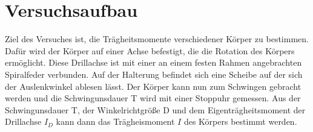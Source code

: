 \section{Versuchsaufbau}
\label{sec:Versuchsaufbau}

Ziel des Versuches ist, die Trägheitsmomente verschiedener Körper zu bestimmen. 
Dafür wird der Körper auf einer Achse befestigt, die die Rotation des Körpers ermöglicht.
Diese Drillachse ist mit einer an einem festen Rahmen angebrachten Spiralfeder verbunden.
Auf der Halterung befindet sich eine Scheibe auf der sich der Auslenkwinkel ablesen lässt.
Der Körper kann nun zum Schwingen gebracht werden und die Schwingunsdauer T wird mit einer Stoppuhr gemessen.
Aus der Schwingunsdauer T, der Winkelrichtgröße D und dem Eigenträgheitsmoment der Drillachse $I_D$  
kann dann das Trägheismoment $I$ des Körpers bestimmt werden. 